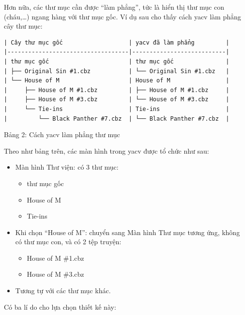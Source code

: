 \documentclass[
]{article}
\begin{document}
Hơn nữa, các thư mục cần được ``làm phẳng'', tức là hiển thị thư mục con
(cháu,\ldots) ngang hàng với thư mục gốc. Ví dụ sau cho thấy cách yacv
làm phẳng cây thư mục:

\begin{verbatim}
| Cây thư mục gốc                   | yacv đã làm phẳng         |
|-----------------------------------|---------------------------|
| thư mục gốc                       | thư mục gốc               |
| ├── Original Sin #1.cbz           | └── Original Sin #1.cbz   |
| └── House of M                    | House of M                |
|     ├── House of M #1.cbz         | ├── House of M #1.cbz     |
|     ├── House of M #3.cbz         | └── House of M #3.cbz     |
|     └── Tie-ins                   | Tie-ins                   |
|         └── Black Panther #7.cbz  | └── Black Panther #7.cbz  |
\end{verbatim}

Bảng 2: Cách yacv làm phẳng thư mục

Theo như bảng trên, các màn hình trong yacv được tổ chức như sau:

\begin{itemize}
\item
  Màn hình Thư viện: có 3 thư mục:

  \begin{itemize}
    \item
    thư mục gốc
  \item
    House of M
  \item
    Tie-ins
  \end{itemize}
\item
  Khi chọn ``House of M'': chuyển sang Màn hình Thư mục tương ứng, không
  có thư mục con, và có 2 tệp truyện:

  \begin{itemize}
    \item
    House of M \#1.cbz
  \item
    House of M \#3.cbz
  \end{itemize}
\item
  Tương tự với các thư mục khác.
\end{itemize}

Có ba lí do cho lựa chọn thiết kế này:
\end{document}
